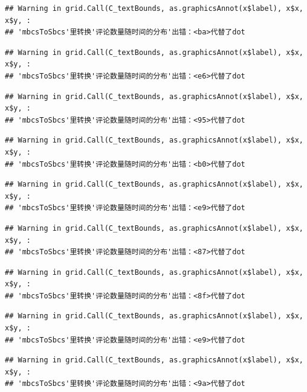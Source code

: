 \documentclass[
]{article}
\begin{document}
\begin{verbatim}
## Warning in grid.Call(C_textBounds, as.graphicsAnnot(x$label), x$x, x$y, :
## 'mbcsToSbcs'里转换'评论数量随时间的分布'出错：<ba>代替了dot
\end{verbatim}

\begin{verbatim}
## Warning in grid.Call(C_textBounds, as.graphicsAnnot(x$label), x$x, x$y, :
## 'mbcsToSbcs'里转换'评论数量随时间的分布'出错：<e6>代替了dot
\end{verbatim}

\begin{verbatim}
## Warning in grid.Call(C_textBounds, as.graphicsAnnot(x$label), x$x, x$y, :
## 'mbcsToSbcs'里转换'评论数量随时间的分布'出错：<95>代替了dot
\end{verbatim}

\begin{verbatim}
## Warning in grid.Call(C_textBounds, as.graphicsAnnot(x$label), x$x, x$y, :
## 'mbcsToSbcs'里转换'评论数量随时间的分布'出错：<b0>代替了dot
\end{verbatim}

\begin{verbatim}
## Warning in grid.Call(C_textBounds, as.graphicsAnnot(x$label), x$x, x$y, :
## 'mbcsToSbcs'里转换'评论数量随时间的分布'出错：<e9>代替了dot
\end{verbatim}

\begin{verbatim}
## Warning in grid.Call(C_textBounds, as.graphicsAnnot(x$label), x$x, x$y, :
## 'mbcsToSbcs'里转换'评论数量随时间的分布'出错：<87>代替了dot
\end{verbatim}

\begin{verbatim}
## Warning in grid.Call(C_textBounds, as.graphicsAnnot(x$label), x$x, x$y, :
## 'mbcsToSbcs'里转换'评论数量随时间的分布'出错：<8f>代替了dot
\end{verbatim}

\begin{verbatim}
## Warning in grid.Call(C_textBounds, as.graphicsAnnot(x$label), x$x, x$y, :
## 'mbcsToSbcs'里转换'评论数量随时间的分布'出错：<e9>代替了dot
\end{verbatim}

\begin{verbatim}
## Warning in grid.Call(C_textBounds, as.graphicsAnnot(x$label), x$x, x$y, :
## 'mbcsToSbcs'里转换'评论数量随时间的分布'出错：<9a>代替了dot
\end{verbatim}
\end{document}
